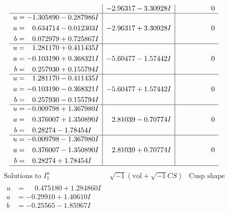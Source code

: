\documentclass[1p]{elsarticle_modified}
\theoremstyle{definition}
\newcommand{\I}{\sqrt{-1}}
\begin{document}
$$\begin{array}{c|c|c}
 & -2.96317 - 3.30928 I & \phantom{-0.000000 } 0 \\ \hline\begin{aligned}
u &= -1.305890 - 0.287986 I \\
a &= \phantom{-}0.634714 - 0.012303 I \\
b &= \phantom{-}0.072979 + 0.725867 I\end{aligned}
 & -2.96317 + 3.30928 I & \phantom{-0.000000 } 0 \\ \hline\begin{aligned}
u &= \phantom{-}1.281170 + 0.411435 I \\
a &= -0.103190 + 0.368321 I \\
b &= \phantom{-}0.257930 + 0.155794 I\end{aligned}
 & -5.60477 - 1.57442 I & \phantom{-0.000000 } 0 \\ \hline\begin{aligned}
u &= \phantom{-}1.281170 - 0.411435 I \\
a &= -0.103190 - 0.368321 I \\
b &= \phantom{-}0.257930 - 0.155794 I\end{aligned}
 & -5.60477 + 1.57442 I & \phantom{-0.000000 } 0 \\ \hline\begin{aligned}
u &= -0.009798 + 1.367980 I \\
a &= \phantom{-}0.376007 + 1.350890 I \\
b &= \phantom{-}0.28274 - 1.78454 I\end{aligned}
 & \phantom{-}2.81039 - 0.70774 I & \phantom{-0.000000 } 0 \\ \hline\begin{aligned}
u &= -0.009798 - 1.367980 I \\
a &= \phantom{-}0.376007 - 1.350890 I \\
b &= \phantom{-}0.28274 + 1.78454 I\end{aligned}
 & \phantom{-}2.81039 + 0.70774 I & \phantom{-0.000000 } 0\\
 \hline 
 \end{array}$$\newpage$$\begin{array}{c|c|c}  
\text{Solutions to }I^u_{1}& \I (\text{vol} + \sqrt{-1}CS) & \text{Cusp shape}\\
 \hline 
\begin{aligned}
u &= \phantom{-}0.475180 + 1.284860 I \\
a &= -0.29910 + 1.40610 I \\
b &= -0.25565 - 1.85967 I\end{aligned}

\end{array}$$
\end{document}
